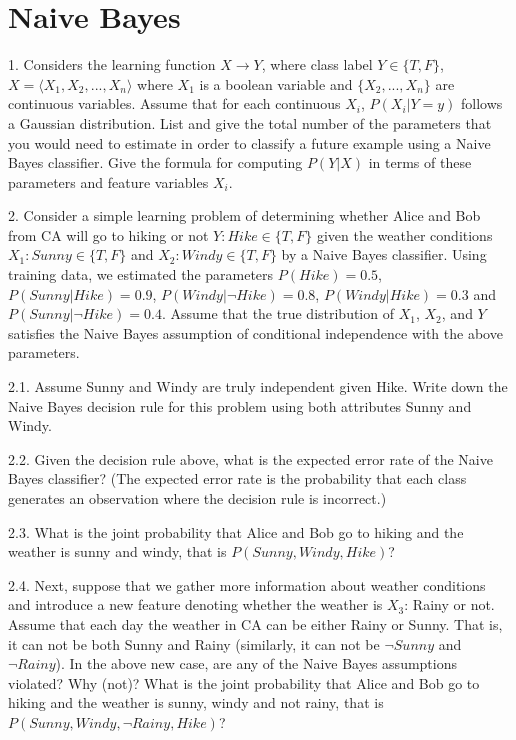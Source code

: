 \documentclass{article}
\theoremstyle{definition}
\theoremstyle{definition}
\theoremstyle{remark}
\begin{document}
\section*{Naive Bayes}

1. Considers the learning function $X \rightarrow Y$, where class label $Y\in\{T,F\}$, $X=\langle X_1,X_2,...,X_n \rangle$ where $X_1$ is a boolean variable and $\{X_2,...,X_n\}$ are continuous variables. Assume that for each continuous $X_i$, $P(X_i|Y=y)$ follows a Gaussian distribution. List and give the total number of the parameters that you would need to estimate in order to classify a future example using a Naive Bayes classifier.
Give the formula for computing $P(Y|X)$ in terms of these
parameters and feature variables $X_i$.

2. Consider a simple learning problem of determining whether Alice and Bob from CA will go to hiking or not
$Y:Hike\in\{T,F\}$ given the weather conditions $X_1:Sunny\in\{T,F\}$ and $X_2:Windy\in\{T,F\}$ by a
Naive Bayes classifier. Using training data, we estimated the parameters $P(Hike) = 0.5$, $P(Sunny|Hike) = 0.9$, $P(Windy|\neg Hike) = 0.8$, $P(Windy|Hike) = 0.3$ and $P(Sunny|\neg Hike) = 0.4$. Assume that the true distribution of $X_1$, $X_2$, and $Y$ satisfies the Naive Bayes
assumption of conditional independence with the above parameters.

2.1. Assume Sunny and Windy are truly independent given Hike. Write down the Naive Bayes
decision rule for this problem using both attributes Sunny and Windy.

2.2. Given the decision rule above, what is the expected error rate of the Naive Bayes classifier? (The
expected error rate is the probability that each class generates an observation where the decision
rule is incorrect.)

2.3. What is the joint probability that Alice and Bob go to hiking and the weather is sunny and
windy, that is $P(Sunny,Windy,Hike)$?

2.4. Next, suppose that we gather more information about weather conditions and introduce a new feature
denoting whether the weather is $X_3$: Rainy or not. Assume that each day the weather in CA can
be either Rainy or Sunny. That is, it can not be both Sunny and Rainy (similarly, it can not be
$\neg Sunny$ and $\neg Rainy$). In the above new case, are any of the Naive Bayes assumptions violated? Why (not)? What is
the joint probability that Alice and Bob go to hiking and the weather is sunny, windy and not
rainy, that is $P(Sunny,Windy,\neg Rainy,Hike)$?
\end{document}
